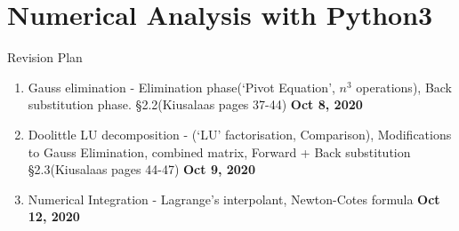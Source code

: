 \chapter{Numerical Analysis with Python3}
Revision Plan
\begin{enumerate}[label=Day \arabic*]
	\item Gauss elimination - Elimination phase(`Pivot Equation', $n^3$ operations), Back substitution phase. \S 2.2(Kiusalaas pages 37-44) \textbf{Oct 8, 2020}
	\item Doolittle LU decomposition - (`LU' factorisation, Comparison), Modifications to Gauss Elimination, combined matrix, Forward + Back substitution \S 2.3(Kiusalaas pages 44-47) \textbf{Oct 9, 2020}
	\item Numerical Integration - Lagrange's interpolant, Newton-Cotes formula \textbf{Oct 12, 2020}
\end{enumerate}
